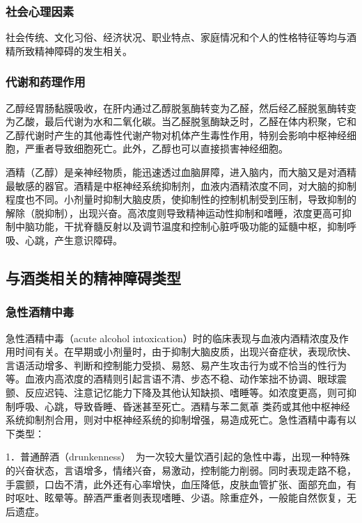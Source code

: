 \subsubsection{社会心理因素}

社会传统、文化习俗、经济状况、职业特点、家庭情况和个人的性格特征等均与酒精所致精神障碍的发生相关。

\subsubsection{代谢和药理作用}

乙醇经胃肠黏膜吸收，在肝内通过乙醇脱氢酶转变为乙醛，然后经乙醛脱氢酶转变为乙酸，最后代谢为水和二氧化碳。当乙醛脱氢酶缺乏时，乙醛在体内积聚，它和乙醇代谢时产生的其他毒性代谢产物对机体产生毒性作用，特别会影响中枢神经细胞，严重者导致细胞死亡。此外，乙醇也可以直接损害神经细胞。

酒精（乙醇）是亲神经物质，能迅速透过血脑屏障，进入脑内，而大脑又是对酒精最敏感的器官。酒精是中枢神经系统抑制剂，血液内酒精浓度不同，对大脑的抑制程度也不同。小剂量时抑制大脑皮质，使抑制性的控制机制受到压制，导致抑制的解除（脱抑制），出现兴奋。高浓度则导致精神运动性抑制和嗜睡，浓度更高可抑制中脑功能，干扰脊髓反射以及调节温度和控制心脏呼吸功能的延髓中枢，抑制呼吸、心跳，产生意识障碍。

\subsection{与酒类相关的精神障碍类型}

\subsubsection{急性酒精中毒}

急性酒精中毒（acute alcohol
intoxication）时的临床表现与血液内酒精浓度及作用时间有关。在早期或小剂量时，由于抑制大脑皮质，出现兴奋症状，表现欣快、言语活动增多、判断和控制能力受损、易怒、易产生攻击行为或不恰当的性行为等。血液内高浓度的酒精则引起言语不清、步态不稳、动作笨拙不协调、眼球震颤、反应迟钝、注意记忆能力下降及其他认知缺损、嗜睡等。如浓度更高，则可抑制呼吸、心跳，导致昏睡、昏迷甚至死亡。酒精与苯二氮䓬
类药或其他中枢神经系统抑制剂合用，则对中枢神经系统的抑制增强，易造成死亡。急性酒精中毒有以下类型：

1．普通醉酒（drunkenness）　为一次较大量饮酒引起的急性中毒，出现一种特殊的兴奋状态，言语增多，情绪兴奋，易激动，控制能力削弱。同时表现走路不稳，手震颤，口齿不清，此外还有心率增快，血压降低，皮肤血管扩张、面部充血，有时呕吐、眩晕等。醉酒严重者则表现嗜睡、少语。除重症外，一般能自然恢复，无后遗症。


